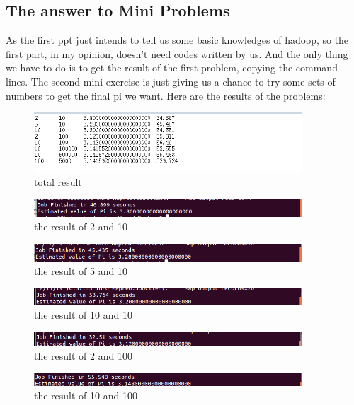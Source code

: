 \documentclass{article}
\begin{document}
\subsection{The answer to Mini Problems}
As the first ppt just intends to tell us some basic knowledges of hadoop, so the first part, in my opinion, doesn't need codes written by us. And the only thing we have to do is to get the result of the first problem, copying the command lines. The second mini exercise is just giving us a chance to try some sets of numbers to get the final pi we want.
Here are the results of the problems:
\begin{figure}[htbp]
\centering
\includegraphics[width=10cm]{000.png}
\caption{total result}
\end{figure}
\begin{figure}[htbp]
\centering
\includegraphics[width=10cm]{001.png}
\caption{the result of 2 and 10}
\end{figure}
\begin{figure}[htbp]
\centering
\includegraphics[width=10cm]{002.png}
\caption{the result of 5 and 10}
\end{figure}
\begin{figure}[htbp]
\centering
\includegraphics[width=10cm]{003.png}
\caption{the result of 10 and 10}
\end{figure}
\begin{figure}[htbp]
\centering
\includegraphics[width=10cm]{004.png}
\caption{the result of 2 and 100}
\end{figure}
\begin{figure}[htbp]
\centering
\includegraphics[width=10cm]{005.png}
\caption{the result of 10 and 100}
\end{figure}
\end{document}
